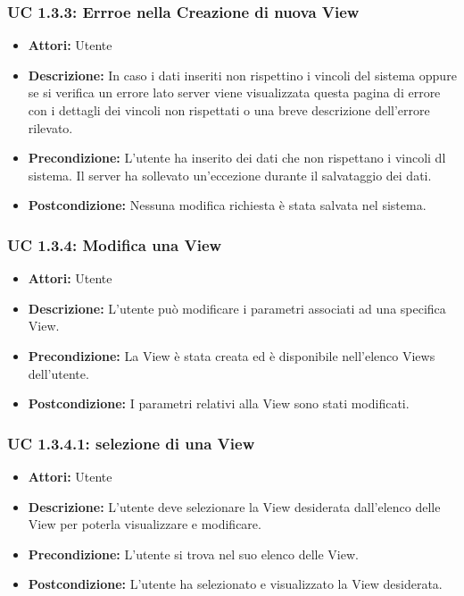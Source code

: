\subsubsection{UC 1.3.3: Errroe nella Creazione di nuova View}

\begin{itemize}
\item \textbf{Attori:} Utente
\item \textbf{Descrizione:} In caso i dati inseriti non rispettino i vincoli del sistema oppure se si verifica un errore lato server viene visualizzata questa pagina di errore con i dettagli dei vincoli non rispettati o una breve descrizione dell'errore rilevato.
\item \textbf{Precondizione:} L'utente ha inserito dei dati che non rispettano i vincoli dl sistema. Il server ha sollevato un'eccezione durante il salvataggio dei dati.
\item \textbf{Postcondizione:} Nessuna modifica richiesta è stata salvata nel sistema.
\end{itemize}

\subsubsection{UC 1.3.4: Modifica una View}

\begin{itemize}
\item \textbf{Attori:} Utente
\item \textbf{Descrizione:} L'utente può modificare i parametri associati ad una specifica View.
\item \textbf{Precondizione:} La View è stata creata ed è disponibile nell'elenco Views dell'utente.
\item \textbf{Postcondizione:} I parametri relativi alla View sono stati modificati.
\end{itemize}

\subsubsection{UC 1.3.4.1: selezione di una View}

\begin{itemize}
\item \textbf{Attori:} Utente
\item \textbf{Descrizione:} L'utente deve selezionare la View desiderata dall'elenco delle View per poterla visualizzare e modificare.
\item \textbf{Precondizione:} L'utente si trova nel suo elenco delle View.
\item \textbf{Postcondizione:} L'utente ha selezionato e visualizzato la View desiderata.
\end{itemize}

